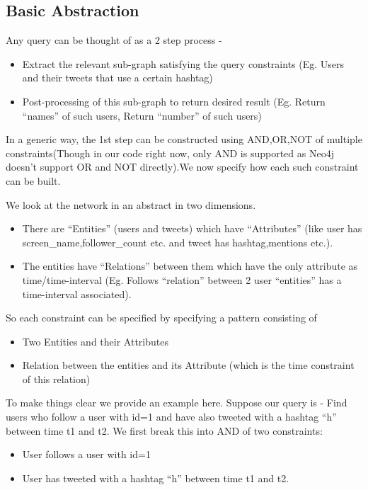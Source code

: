 \documentclass[letterpaper,10pt,english]{sphinxmanual}
\begin{document}
\subsection{Basic Abstraction}
\label{\detokenize{neo4j_query_generation:basic-abstraction}}
Any query can be thought of as a 2 step process -
\begin{itemize}
\item {} 
Extract the relevant sub-graph satisfying the query constraints (Eg. Users and their tweets that use a certain hashtag)

\item {} 
Post-processing of this sub-graph to return desired result (Eg. Return “names” of such users, Return “number” of such users)

\end{itemize}

In a generic way, the 1st step can be constructed using AND,OR,NOT of multiple constraints(Though in our code right now, only AND is supported as Neo4j doesn’t support OR and NOT directly).We now specify how each such constraint can be built.

We look at the network in an abstract in two dimensions.
\begin{itemize}
\item {} 
There are “Entities” (users and tweets) which have “Attributes” (like user has screen\_name,follower\_count etc. and tweet has hashtag,mentions etc.).

\item {} 
The entities have “Relations” between them which have the only attribute as time/time-interval (Eg. Follows “relation” between 2 user “entities” has a time-interval associated).

\end{itemize}

So each constraint can be specified by specifying a pattern consisting of
\begin{itemize}
\item {} 
Two Entities and their Attributes

\item {} 
Relation between the entities and its Attribute (which is the time constraint of this relation)

\end{itemize}

To make things clear we provide an example here.
Suppose our query is - Find users who follow a user with id=1 and have also tweeted with a hashtag “h” between time t1 and t2.
We first break this into AND of two constraints:
\begin{itemize}
\item {} 
User follows a user with id=1

\item {} 
User has tweeted with a hashtag “h” between time t1 and t2.

\end{itemize}
\end{document}
